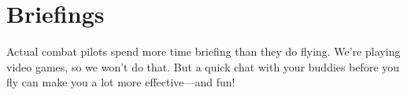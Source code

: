 \chapter{Briefings}

Actual combat pilots spend more time briefing than they do flying.
We're playing video games, so we won't do that.
But a quick chat with your buddies before you fly can make you a lot more
effective---and fun!
